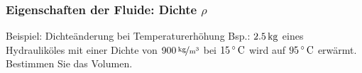 \begin{frame}
  \frametitle{Eigenschaften der Fluide: Dichte $\rho$}
  \begin{block}{Beispiel: Dichte\"anderung bei Temperaturerh\"ohung}
    Bsp.: $\unit[2.5]{kg}$ eines Hydraulik\"oles mit einer Dichte von 
    $\unitfrac[900]{kg}{m^3}$ bei $\unit[15]{^\circ\,C}$ wird auf 
    $\unit[95]{^\circ\,C}$ erwärmt.
  Bestimmen Sie das Volumen.

  \end{block}


   \ifteacher%
   \else%
     \vspace*{-1.0\baselineskip}\rotatebox[origin=lB]{180}{%
     \resizebox{0.9\linewidth}{!}{\parbox[t]{3.95\linewidth}{%
     \ %
     }}}
   \fi%
  

\end{frame}

